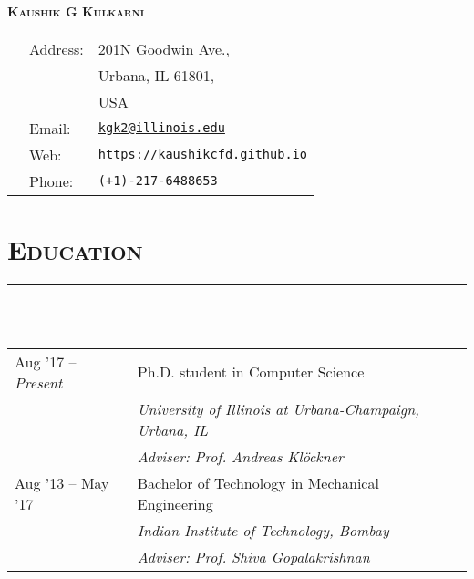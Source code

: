 \documentclass[letterpaper, 13pt]{article}
\begin{document}

\begin{center}
    \LARGE
    \textsc{\textbf{
    Kaushik G Kulkarni}}\\
    \vspace{1ex}
    \normalsize
    \begin{tabular}{p{}p{8ex} p{}}
        & Address:    & 201N Goodwin Ave.,\\
        &             & Urbana, IL 61801,\\
        &             & USA\\
        & Email:      &\href{mailto:kgk2@illinois.edu}{\texttt{kgk2@illinois.edu}}\\
        & Web:        & \texttt{\small \url{https://kaushikcfd.github.io}} \\
        & Phone:      &\texttt{(+1)-217-6488653}
    \end{tabular}
\end{center}



\section*{\Large\textsc{Education}}
\vspace{-4ex}
\rule{\textwidth}{0.1ex}\\
\vspace{1ex}\\
\begin{tabular}{p{} p{}}
Aug '17 --  \textit{Present}  & Ph.D. student in Computer Science \\
                              & \textit{University of Illinois at Urbana-Champaign, Urbana, IL} \\
                              & \textit{Adviser: Prof. Andreas Kl\"{o}ckner}\vspace{1ex}\\
Aug '13 -- May '17            & Bachelor of Technology in Mechanical Engineering \\
                              & \textit{Indian Institute of Technology, Bombay} \\
                              & \textit{Adviser: Prof. Shiva Gopalakrishnan}
\end{tabular}


\end{document}
